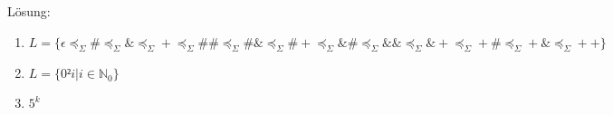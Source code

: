 \documentclass{scrartcl}
\begin{document}
Lösung:
\begin{enumerate}[label=(\alph*)]
\item $L= \{\epsilon \preceq_\Sigma \# \preceq_\Sigma \& \preceq_\Sigma + \preceq_\Sigma \#\# \preceq_\Sigma \#\& \preceq_\Sigma \#+ \preceq_\Sigma \&\# \preceq_\Sigma \&\& \preceq_\Sigma \&+ \preceq_\Sigma +\# \preceq_\Sigma +\& \preceq_\Sigma ++\}$
\item $L = \{0²i | i \in \mathbb{N}_0\}$
\item $5^k$
\end{enumerate}
\end{document}
